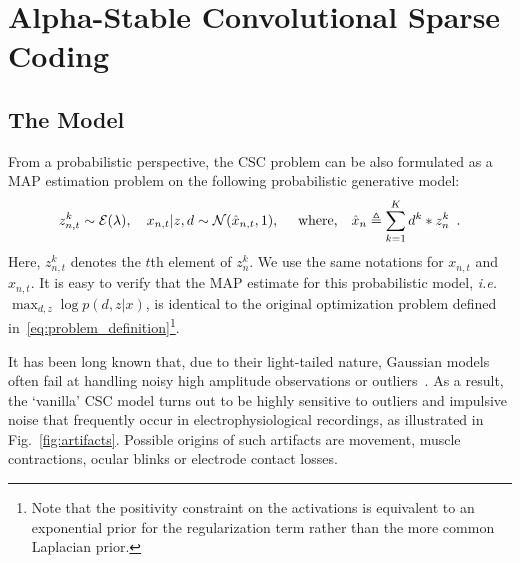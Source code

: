 \section{Alpha-Stable Convolutional Sparse Coding}

\subsection{The Model}


From a probabilistic perspective, the \ac{CSC} problem can be also formulated as a \ac{MAP} estimation problem on the following probabilistic generative model:
%
\begin{align}
z_{n,t}^k \sim {\cal E}(\lambda),
\quad x_{n,t} | z, d \sim {\cal N}( \hat{x}_{n,t},1 ),
\quad \text{ where,}
\quad \hat{x}_n \triangleq \sum_{k=1}^{K}d^{k} * z_{n}^{k} \enspace .
\label{eqn:csc_prob}
\end{align}
%
Here, $z_{n,t}^k$ denotes the $t$th element of $z_{n}^k$. We use the same notations for $x_{n,t}$ and $\hat{x}_{n,t}$. It is easy to verify that the MAP estimate for this probabilistic model, \textit{i.e.}\ $\max_{d,z} \log p(d,z|x)$, is identical to the original optimization problem defined in~\eqref{eq:problem_definition}\footnote{Note that the positivity constraint on the activations is equivalent to an exponential prior for the regularization term rather than the more common Laplacian prior.}.

It has been long known that, due to their light-tailed nature, Gaussian models often fail at handling noisy high amplitude observations or outliers~\citep{Huber81a}. As a result, the `vanilla' \ac{CSC} model turns out to be highly sensitive to outliers and impulsive noise that frequently occur in electrophysiological recordings, as illustrated in Fig.~\ref{fig:artifacts}. Possible origins of such artifacts are movement, muscle contractions, ocular blinks or electrode contact losses.




